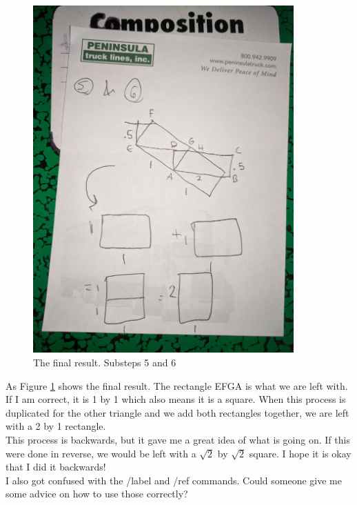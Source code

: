 \documentclass{article}
\begin{document}
\begin{figure}[h]
    \centering
    \includegraphics[width=10cm]{Ex 7.jpg}
    \caption{The final result. Substeps 5 and 6} 
    \label{fig_final_result}
\end{figure}

As Figure \ref{fig_final_result} shows the final result. The rectangle EFGA is what we are left with. If I am correct, it is 1 by 1 which also means it is a square. When this process is duplicated for the other triangle and we add both rectangles together, we are left with a 2 by 1 rectangle.\\
This process is backwards, but it gave me a great idea of what is going on. If this were done in reverse, we would be left with a $\sqrt{2}$ by $\sqrt{2}$ square. I hope it is okay that I did it backwards!\\

I also got confused with the /label and /ref commands. Could someone give me some advice on how to use those correctly?\\

%
\\
\end{document}
